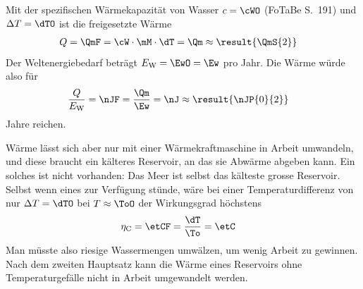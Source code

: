 Mit der spezifischen Wärmekapazität von Wasser $c = \cWO$ (FoTaBe S.~191) und $\Delta T = \dTO$ ist die freigesetzte Wärme
\begin{align}
 Q &= \QmF = \cW\cdot\mM\cdot\dT = \Qm \approx \result{\QmS{2}}
\end{align}
Der Weltenergiebedarf beträgt $E_\text{W} = \EwO = \Ew$ pro Jahr. Die Wärme würde also für
\begin{align}
 \frac{Q}{E_\text{W}} &= \nJF = \frac{\Qm}{\Ew} = \nJ \approx \result{\nJP{0}{2}}
\end{align}
Jahre reichen.

Wärme lässt sich aber nur mit einer Wärmekraftmaschine in Arbeit umwandeln, und diese braucht ein kälteres Reservoir, an das sie Abwärme abgeben kann. Ein solches ist nicht vorhanden: Das Meer ist selbst das kälteste grosse Reservoir. Selbst wenn eines zur Verfügung stünde, wäre bei einer Temperaturdifferenz von nur $\Delta T = \dTO$ bei $T \approx \ToO$ der Wirkungsgrad höchstens
\begin{align}
 \eta_\text{C} &= \etCF = \frac{\dT}{\To} = \etC
\end{align}
Man müsste also riesige Wassermengen umwälzen, um wenig Arbeit zu gewinnen. Nach dem zweiten Hauptsatz kann die Wärme eines Reservoirs ohne Temperaturgefälle nicht in Arbeit umgewandelt werden.
